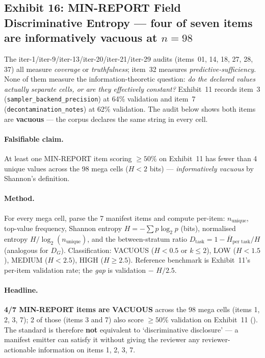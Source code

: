 \subsection{Exhibit 16: MIN-REPORT Field Discriminative Entropy --- four of seven items are informatively vacuous at $n{=}98$}
\label{sec:p5-exhibit-discriminative-entropy}
The iter-1/iter-9/iter-13/iter-20/iter-21/iter-29 audits (items~01, 14,
18, 27, 28, 37) all measure \emph{coverage} or \emph{truthfulness};
item~32 measures \emph{predictive-sufficiency}. None of them measure
the information-theoretic question: \emph{do the declared values
actually separate cells, or are they effectively constant?} Exhibit~11
records item~3 (\texttt{sampler\_backend\_precision}) at 64\% validation
and item~7 (\texttt{decontamination\_notes}) at 62\% validation. The
audit below shows both items are \textbf{vacuous} --- the corpus
declares the same string in every cell.

\paragraph{Falsifiable claim.}
At least one MIN-REPORT item scoring $\geq 50\%$ on Exhibit~11 has
fewer than 4 unique values across the 98 mega cells ($H<2$ bits) ---
\emph{informatively vacuous} by Shannon's definition.

\paragraph{Method.}
For every mega cell, parse the 7 manifest items and compute per-item:
$n_\text{unique}$, top-value frequency, Shannon entropy
$H = -\sum p\log_2 p$ (bits), normalised entropy
$H/\log_2(n_\text{unique})$, and the between-stratum ratio
$D_\text{task} = 1 - \overline{H}_\text{per task}/H$ (analogous for
$D_G$). Classification: VACUOUS ($H<0.5$ or $k\le 2$), LOW
($H<1.5$), MEDIUM ($H<2.5$), HIGH ($H\ge 2.5$). Reference benchmark
is Exhibit~11's per-item validation rate; the \emph{gap} is
validation $-$ $H/2.5$.

\paragraph{Headline.}
\textbf{4/7 MIN-REPORT items are VACUOUS} across the 98 mega cells
(items 1, 2, 3, 7); 2 of those (items 3 and 7) also score $\geq 50\%$
validation on Exhibit~11 ().
The standard is therefore \textbf{not} equivalent to `discriminative
disclosure' --- a manifest emitter can satisfy it without giving the
reviewer any reviewer-actionable information on items 1, 2, 3, 7.


